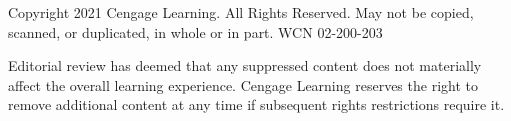 \vfill
\noindent
{\tiny\color{gray}Copyright 2021 Cengage Learning. All Rights Reserved. May not be copied, scanned, or duplicated, in whole or in part. WCN 02-200-203\par
\noindent Editorial review has deemed that any suppressed content does not materially affect the overall learning experience. Cengage Learning reserves the right to remove additional content at any time if subsequent rights restrictions require it.\par}
